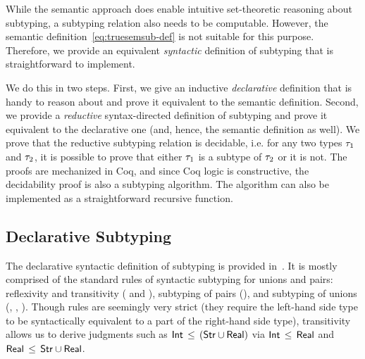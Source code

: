While the semantic approach does enable intuitive set-theo\-re\-tic
reasoning about subtyping,
a subtyping relation also needs to be computable.
However, the semantic definition~\eqref{eq:truesemsub-def}
is not suitable for this purpose.
Therefore, we provide an equivalent 
\emph{syntactic} definition of subtyping that is straightforward to implement.

We do this in two steps. 
First, we give an inductive \emph{declarative} definition
that is handy to reason about 
and prove it equivalent to the semantic definition.
Second, we provide a \emph{reductive} syntax-directed definition of subtyping
and prove it equivalent to the declarative one 
(and, hence, the semantic definition as well).
We prove that the reductive subtyping relation is decidable, 
i.e. for any two types $\tau_1$ and $\tau_2$,
it is possible to prove that either $\tau_1$ is a subtype of $\tau_2$ 
or it is not.
The proofs are mechanized in Coq, and since Coq logic is constructive,
the decidability proof is also a subtyping algorithm.
The algorithm can also be implemented as a straightforward recursive function.

\subsection{Declarative Subtyping}\label{sec:declsub}

The declarative syntactic definition of subtyping is provided in~.
It is mostly comprised of the standard rules
of syntactic subtyping for unions and pairs:
reflexivity and transitivity ( and ), 
subtyping of pairs (),
and subtyping of unions (, , ).
Though  rules are seemingly very strict 
(they require the left-hand side type to be syntactically equivalent
to a part of the right-hand side type), 
transitivity allows us to derive judgments such as
$\mathsf{Int} \, \leq \, (\mathsf{Str} \cup \mathsf{Real})$ via
$\mathsf{Int} \, \leq \, \mathsf{Real}$ and $\mathsf{Real} \, \leq \, \mathsf{Str} \cup \mathsf{Real}$.

